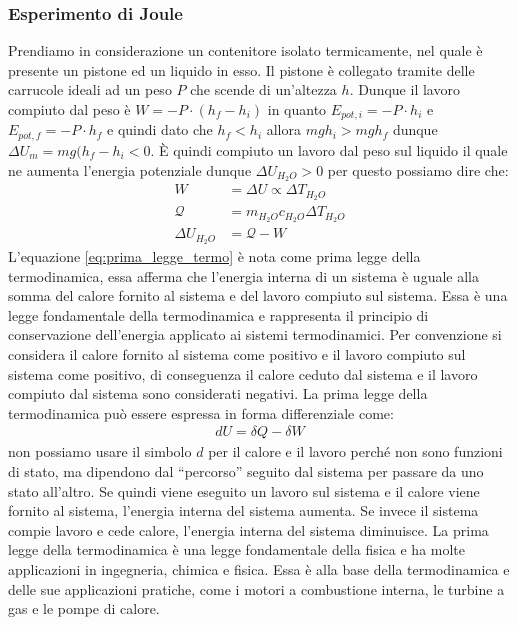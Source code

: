     \subsubsection{Esperimento di Joule}
        Prendiamo in considerazione un contenitore isolato termicamente, nel quale è presente un pistone ed un liquido in esso. Il pistone è collegato tramite delle carrucole ideali ad un peso $P$ che scende di un'altezza $h$. Dunque il lavoro compiuto dal peso è $W=-P\cdot (h_f -h_i)$ in quanto $E_{pot,i}=-P\cdot h_i$ e $E_{pot,f}=-P\cdot h_f$ e quindi dato che $h_f<h_i$ allora $mgh_i>mgh_f$ dunque $\Delta U_m = mg(h_f-h_i<0$. È quindi compiuto un lavoro dal peso sul liquido il quale ne aumenta l'energia potenziale dunque $\Delta U_{H_2O} > 0$  per questo possiamo dire che:
        \begin{align}
            W &= \Delta U \propto \Delta T_{H_2O}\\
            \mathcal{Q} &= m_{H_2O}c_{H_2O}\Delta T_{H_2O}\\
            \Delta U_{H_2O} &= \mathcal{Q} - W \label{eq:prima_legge_termo}
        \end{align}
        L'equazione \ref{eq:prima_legge_termo} è nota come prima legge della termodinamica, essa afferma che l'energia interna di un sistema è uguale alla somma del calore fornito al sistema e del lavoro compiuto sul sistema. Essa è una legge fondamentale della termodinamica e rappresenta il principio di conservazione dell'energia applicato ai sistemi termodinamici.\newline
        Per convenzione si considera il calore fornito al sistema come positivo e il lavoro compiuto sul sistema come positivo, di conseguenza il calore ceduto dal sistema e il lavoro compiuto dal sistema sono considerati negativi. La prima legge della termodinamica può essere espressa in forma differenziale come:
        \begin{align*}
            dU = \delta Q - \delta W
        \end{align*}
        non possiamo usare il simbolo $d$ per il calore e il lavoro perché non sono funzioni di stato, ma dipendono dal ``percorso'' seguito dal sistema per passare da uno stato all'altro.\newline
        Se quindi viene eseguito un lavoro sul sistema e il calore viene fornito al sistema, l'energia interna del sistema aumenta. Se invece il sistema compie lavoro e cede calore, l'energia interna del sistema diminuisce. La prima legge della termodinamica è una legge fondamentale della fisica e ha molte applicazioni in ingegneria, chimica e fisica. Essa è alla base della termodinamica e delle sue applicazioni pratiche, come i motori a combustione interna, le turbine a gas e le pompe di calore.

